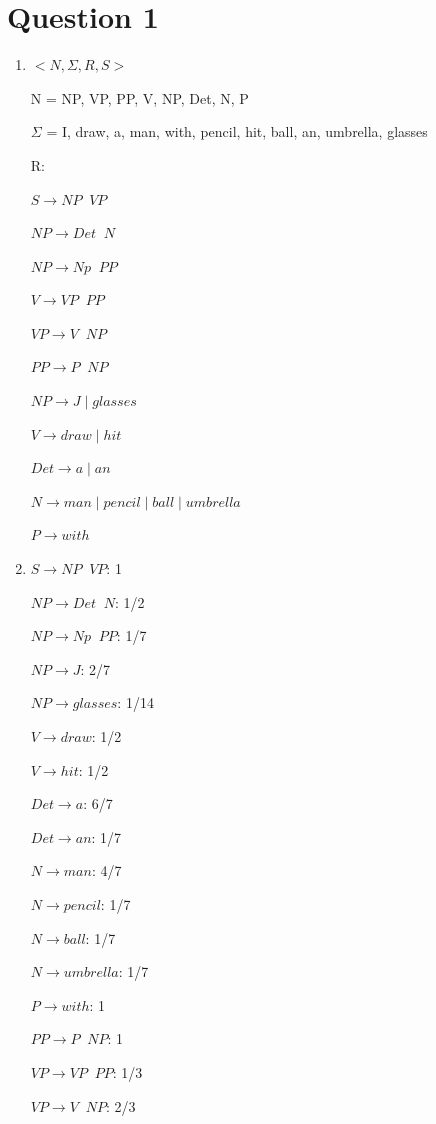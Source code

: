 \documentclass{article}
\begin{document}
\section*{Question 1} 
\begin{enumerate}[label = (\alph*)]
    \item
    $<N, \Sigma, R, S>$
    
    N = {NP, VP, PP, V, NP, Det, N, P}
    
    $\Sigma$ = {I, draw, a, man, with, pencil, hit, ball, an, umbrella, glasses}
    
    R:  
    
    $S \to NP \;\; VP$
    
    $NP \to Det \;\; N$
    
    $NP \to Np \;\; PP$
    
    $V \to VP \;\; PP$
    
    $VP \to V \;\; NP$
    
    $PP \to P \;\; NP$
    
    $NP \to J \; | \; glasses$
    
    $V \to draw \; | \; hit$
    
    $Det \to a \; | \; an$
    
    $N \to man \; | \; pencil \; | \; ball \; | \; umbrella$
    
    $P \to with$
    
    \item
    $S \to NP \;\; VP$: 1
    
    $NP \to Det \;\; N$: 1/2
    
    $NP \to Np \;\; PP$: 1/7
    
    $NP \to J$: 2/7
    
    $NP \to glasses$: 1/14
    
    $V \to draw$: 1/2
    
    $V \to hit$: 1/2
    
    $Det \to a$: 6/7
    
    $Det \to an$: 1/7
    
    $N \to man$: 4/7
    
    $N \to pencil$: 1/7
    
    $N \to ball$: 1/7
    
    $N \to umbrella$: 1/7
    
    $P \to with$: 1
    
    $PP \to P \;\; NP$: 1
    
    $VP \to VP \;\; PP$: 1/3
    
    $VP \to V \;\; NP$: 2/3
    

\end{enumerate}
\end{document}
